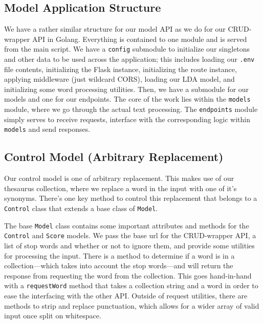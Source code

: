 \documentclass[11pt, twoside, reqno]{book}
\begin{document}
\subsection{Model Application Structure}

We have a rather similar structure for our model API as we do for our CRUD-wrapper API in Golang. Everything is contained to one module and is served from the main script. We have a \texttt{config} submodule to initialize our singletons and other data to be used across the application; this includes loading our \texttt{.env} file contents, initializing the Flask instance, initializing the route instance, applying middleware (just wildcard CORS), loading our LDA model, and initializing some word processing utilities. Then, we have a submodule for our models and one for our endpoints. The core of the work lies within the \texttt{models} module, where we go through the actual text processing. The \texttt{endpoints} module simply serves to receive requests, interface with the corresponding logic within \texttt{models} and send responses.

\subsection{Control Model (Arbitrary Replacement)}

Our control model is one of arbitrary replacement. This makes use of our thesaurus collection, where we replace a word in the input with one of it's synonyms. There's one key method to control this replacement that belongs to a \texttt{Control} class that extends a base class of \texttt{Model}.

The base \texttt{Model} class contains some important attributes and methods for the \texttt{Control} and \texttt{Score} models. We pass the base url for the CRUD-wrapper API, a list of stop words and whether or not to ignore them, and provide some utilities for processing the input. There is a method to determine if a word is in a collection—which takes into account the stop words—and will return the response from requesting the word from the collection. This goes hand-in-hand with a \texttt{requestWord} method that takes a collection string and a word in order to ease the interfacing with the other API. Outside of request utilities, there are methods to strip and replace punctuation, which allows for a wider array of valid input once split on whitespace.
\end{document}
